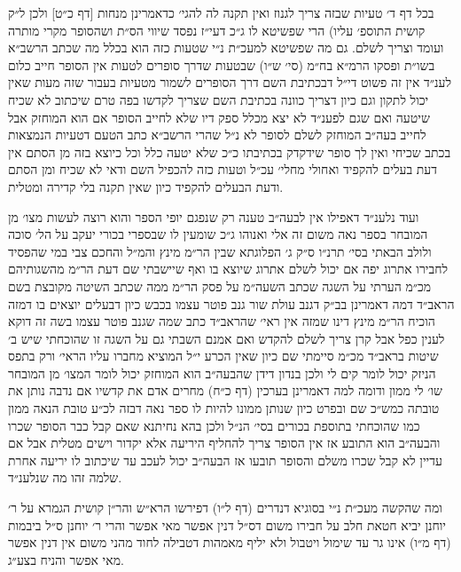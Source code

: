 \documentclass[12pt, openany]{book}
\begin{document}
\begin{multicols}{2}
בכל דף ד׳ טעיות שבזה צריך לגנוז ואין תקנה לה להגי׳ כדאמרינן מנחות [דף כ״ט] ולכן ל״ק קושית התוספ׳ עליו) הרי שפשיטא לו ג״כ דעי״ז נפסד שיווי הס״ת ושהסופר מקרי מותרה ועומד וצריך לשלם. גם מה שפשיטא למעכ״ת נ״י שטעות כזה הוא בכלל מה שכתב הרשב״א בשו״ת ופסקו הרמ״א בח״מ (סי׳ ש״ו) שבטעות שדרך סופרים לטעות אין הסופר חייב כלום לענ״ד אין זה פשוט די״ל דבכתיבת השם דרך הסופרים לשמור מטעיות בעבור שזה מעות שאין יכול לתקון וגם כיון דצריך כוונה בכתיבת השם שצריך לקדשו בפה טרם שיכתוב לא שכיח שיטעה ואם שגם לפענ״ד לא יצא מכלל ספק דיו שלא לחייב הסופר אם הוא המוחזק אבל לחייב בעה״ב המוחזק לשלם לסופר לא נ״ל שהרי הרשב״א כתב הטעם דטעיות הנמצאות בכתב שכיחי ואין לך סופר שידקדק בכתיבתו כ״כ שלא יטעה כלל וכל כיוצא בזה מן הסתם אין דעת בעלים להקפיד ואחולי מחלי׳ עכ״ל וטעות כזה להכפיל השם ודאי לא שכיח ומן הסתם ודעת הבעלים להקפיד כיון שאין תקנה בלי קדירה ומטלית.\\\vspace{0pt}

ועוד נלענ״ד דאפילו אין לבעה״ב טענה רק שנפגם יופי הספר והוא רוצה לעשות מצו׳ מן המובחר בספר נאה משום זה אלי ואנוהו ג״כ שומעין לו שבספרי בכורי יעקב על הל׳ סוכה ולולב הבאתי בסי׳ תרנ״ו ס״ק ג׳ הפלוגתא שבין הר״מ מינץ והמ״ל והחכם צבי במי שהפסיד לחבירו אתרוג יפה אם יכול לשלם אתרוג שיוצא בו ואף שיישבתי שם דעת הר״מ מהשגותיהם מכ״מ הערתי על השגה שכתב השעה״מ על פסק הר״מ ממה שכתב השיטה מקובצת בשם הראב״ד דמה דאמרינן בב״ק דגנב עולת שור גנב פוטר עצמו בכבש כיון דבעלים יוצאים בו דמזה הוכיח הר״מ מינץ דינו שמזה אין ראי׳ שהראב״ד כתב שמה שגנב פוטר עצמו בשה זה דוקא לענין כפל אבל קרן צריך לשלם להקדש ואם אמנם השבתי גם על השגה זו שהוכחתי שיש ב׳ שיטות בראב״ד מכ״מ סיימתי שם כיון שאין הכרע י״ל המוציא מחברו עליו הראי׳ ורק בתפס הניזק יכול לומר קים לי ולכן בנדון דידן שהבעה״ב הוא המוחזק יכול לומר המצו׳ מן המובחר שו׳ לי ממון ודומה למה דאמרינן בערכין (דף כ״ח) מחרים אדם את קדשיו אם נדבה נותן את טובתה כמש״כ שם ובפרט כיון שנותן ממונו להיות לו ספר נאה דבזה לכ״ע טובת הנאה ממון כמו שהוכחתי בתוספת בכורים בסי׳ הנ״ל ולכן בהא נחיתנא שאם קבל כבר הסופר שכרו והבעה״ב הוא התובע אז אין הסופר צריך להחליף היריעה אלא יקדור וישים מטלית אבל אם עדיין לא קבל שכרו משלם והסופר תובעו אז הבעה״ב יכול לעכב עד שיכתוב לו יריעה אחרת שלמה זהו מה שנלענ״ד.\\\vspace{0pt}

ומה שהקשה מעכ״ת נ״י בסוגיא דנדרים (דף ל״ו) דפירשו הרא״ש והר״ן קושית הגמרא על ר׳ יוחנן יביא חטאת חלב על חבירו משום דס״ל דנין אפשר מאי אפשר והרי ר׳ יוחנן ס״ל ביבמות (דף מ״ו) אינו גר עד שימול ויטבול ולא יליף מאמהות דטבילה לחוד מהני משום אין דנין אפשר מאי אפשר והניח בצע״ג.\\\vspace{0pt}


\end{multicols}
\end{document}
